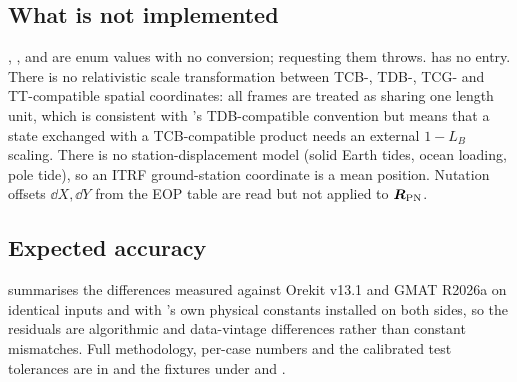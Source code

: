 \subsection{What is not implemented}

, ,  and  are enum values with no
conversion; requesting them throws.  has no
 entry. There is no relativistic scale transformation
between TCB-, TDB-, TCG- and TT-compatible spatial coordinates: all frames
are treated as sharing one length unit, which is consistent with \lupnt{}'s
TDB-compatible convention but means that a state exchanged with a
TCB-compatible product needs an external $1-L_B$ scaling. There is no
station-displacement model (solid Earth tides, ocean loading, pole tide), so
an ITRF ground-station coordinate is a mean position. Nutation offsets
$\dd X, \dd Y$ from the EOP table are read but not applied to
$\bm{R}_{\mathrm{PN}}$.

\subsection{Expected accuracy}

 summarises the differences measured against Orekit
v13.1 and GMAT R2026a on identical inputs and with \lupnt{}'s own physical
constants installed on both sides, so the residuals are algorithmic and
data-vintage differences rather than constant mismatches. Full methodology,
per-case numbers and the calibrated test tolerances are in
 and the fixtures under
 and .

